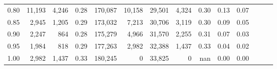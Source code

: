 \begin{tabular}{rrrrrrrrrrrrrr}
0.80 &  11,193 &  4,246 &  0.28 &  170,087 &   10,158 &  29,501 &   4,324 &  0.30 &  0.13 &      0.07 \\
0.85 &   2,945 &  1,205 &  0.29 &  173,032 &    7,213 &  30,706 &   3,119 &  0.30 &  0.09 &      0.05 \\
0.90 &   2,247 &    864 &  0.28 &  175,279 &    4,966 &  31,570 &   2,255 &  0.31 &  0.07 &      0.03 \\
0.95 &   1,984 &    818 &  0.29 &  177,263 &    2,982 &  32,388 &   1,437 &  0.33 &  0.04 &      0.02 \\
1.00 &   2,982 &  1,437 &  0.33 &  180,245 &        0 &  33,825 &       0 &   nan &  0.00 &      0.00 \\
\bottomrule
\end{tabular}
